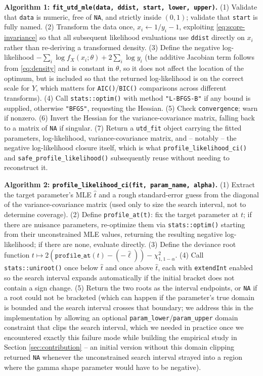 \textbf{Algorithm 1: \texttt{fit\_utd\_mle(data, ddist, start, lower, upper)}.}
(1) Validate that \texttt{data} is numeric, free of \texttt{NA}, and
strictly inside $(0,1)$; validate that \texttt{start} is fully named.
(2) Transform the data once, $x_i \leftarrow 1/y_i - 1$, exploiting
\eqref{eq:score-invariance} so that all subsequent likelihood
evaluations use \texttt{ddist} directly on $x_i$ rather than
re-deriving a transformed density. (3) Define the negative
log-likelihood $-\sum_i \log f_X(x_i;\theta) + 2\sum_i \log y_i$ (the
additive Jacobian term follows from \eqref{eq:density} and is constant
in $\theta$, so it does not affect the location of the optimum, but is
included so that the returned log-likelihood is on the correct scale
for $Y$, which matters for \texttt{AIC()}/\texttt{BIC()}
comparisons across different transforms). (4) Call
\texttt{stats::optim()} with method \texttt{"L-BFGS-B"} if any bound is
supplied, otherwise \texttt{"BFGS"}, requesting the Hessian. (5) Check
\texttt{convergence}; warn if nonzero. (6) Invert the Hessian for the
variance-covariance matrix, falling back to a matrix of \texttt{NA} if
singular. (7) Return a \texttt{utd\_fit} object carrying the fitted
parameters, log-likelihood, variance-covariance matrix, and -- notably
-- the negative log-likelihood closure itself, which is what
\texttt{profile\_likelihood\_ci()} and \texttt{safe\_profile\_likelihood()}
subsequently reuse without needing to reconstruct it.

\textbf{Algorithm 2: \texttt{profile\_likelihood\_ci(fit, param\_name, alpha)}.}
(1) Extract the target parameter's MLE $\hat t$ and a rough standard-error
guess from the diagonal of the variance-covariance matrix (used only to
size the search interval, not to determine coverage). (2) Define
\texttt{profile\_at(t)}: fix the target parameter at $t$; if there are
nuisance parameters, re-optimize them via \texttt{stats::optim()}
starting from their unconstrained MLE values, returning the resulting
negative log-likelihood; if there are none, evaluate directly. (3)
Define the deviance root function $t \mapsto 2(\texttt{profile\_at}(t)
- (-\hat\ell)) - \chi^2_{1,1-\alpha}$. (4) Call
\texttt{stats::uniroot()} once below $\hat t$ and once above $\hat t$,
each with \texttt{extendInt} enabled so the search interval expands
automatically if the initial bracket does not contain a sign change.
(5) Return the two roots as the interval endpoints, or \texttt{NA} if a
root could not be bracketed (which can happen if the parameter's true
domain is bounded and the search interval crosses that boundary; we
address this in the implementation by allowing an optional
\texttt{param\_lower}/\texttt{param\_upper} domain constraint that
clips the search interval, which we needed in practice once we
encountered exactly this failure mode while building the empirical
study in Section \ref{sec:contribution} -- an initial version without
this domain clipping returned \texttt{NA} whenever the unconstrained
search interval strayed into a region where the gamma shape parameter
would have to be negative).

